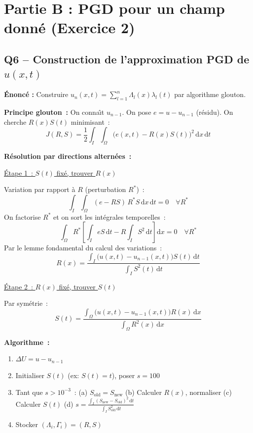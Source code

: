 \documentclass[11pt,a4paper]{article}
\begin{document}
\section{Partie B : PGD pour un champ donn\'e (Exercice 2)}

\subsection{Q6 -- Construction de l'approximation PGD de $u(x,t)$}

\textbf{\'Enonc\'e :} Construire $u_n(x,t) = \sum_{l=1}^{n}\Lambda_l(x)\lambda_l(t)$ par algorithme glouton.

\begin{formulabox}
\textbf{Principe glouton~:} On conna\^{\i}t $u_{n-1}$. On pose $e = u - u_{n-1}$ (r\'esidu). On cherche $R(x)S(t)$ minimisant~:
\[
J(R,S) = \frac{1}{2}\int_I\int_\Omega \big(e(x,t) - R(x)S(t)\big)^2\,\mathrm{d}x\,\mathrm{d}t
\]

\textbf{R\'esolution par directions altern\'ees~:}

\medskip
\underline{\'Etape 1~: $S(t)$ fix\'e, trouver $R(x)$}

Variation par rapport \`a $R$ (perturbation $R^*$)~:
\[
\int_I\int_\Omega (e - RS)\,R^*S\,\mathrm{d}x\,\mathrm{d}t = 0 \quad\forall R^*
\]
On factorise $R^*$ et on sort les int\'egrales temporelles~:
\[
\int_\Omega R^*\left[\int_I eS\,\mathrm{d}t - R\int_I S^2\,\mathrm{d}t\right]\mathrm{d}x = 0 \quad\forall R^*
\]
Par le lemme fondamental du calcul des variations~:
\[
\boxed{R(x) = \frac{\displaystyle\int_I\big(u(x,t)-u_{n-1}(x,t)\big)S(t)\,\mathrm{d}t}{\displaystyle\int_I S^2(t)\,\mathrm{d}t}}
\]

\underline{\'Etape 2~: $R(x)$ fix\'e, trouver $S(t)$}

Par sym\'etrie~:
\[
\boxed{S(t) = \frac{\displaystyle\int_\Omega\big(u(x,t)-u_{n-1}(x,t)\big)R(x)\,\mathrm{d}x}{\displaystyle\int_\Omega R^2(x)\,\mathrm{d}x}}
\]

\textbf{Algorithme~:}
\begin{enumerate}[nosep]
\item $\Delta U = u - u_{n-1}$
\item Initialiser $S(t)$ (ex: $S(t) = t$), poser $s=100$
\item Tant que $s > 10^{-3}$~: (a) $S_\text{old} = S_\text{new}$ \quad (b) Calculer $R(x)$, normaliser \quad (c) Calculer $S(t)$ \quad (d) $s = \frac{\int_I(S_\text{new}-S_\text{old})^2\,\mathrm{d}t}{\int_I S_\text{old}^2\,\mathrm{d}t}$
\item Stocker $(\Lambda_i, \Gamma_i) = (R,S)$
\end{enumerate}
\end{formulabox}
\end{document}
